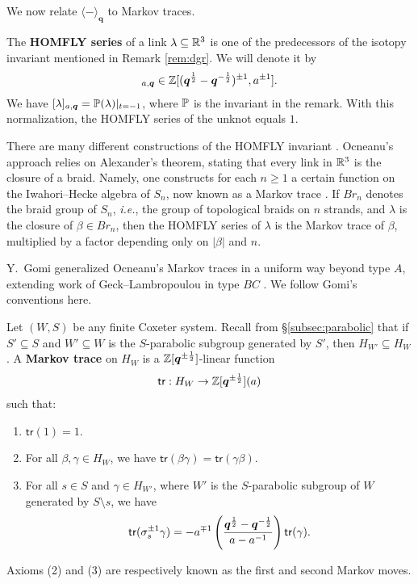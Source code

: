 \documentclass[a4paper,10pt,leqno]{amsart}
\theoremstyle{plain}
\theoremstyle{plain}
\theoremstyle{plain}
\theoremstyle{definition}
\theoremstyle{remark}
\newcommand{\dfemph}[1]{\textbf{#1}}
\newcommand{\Br}{\mathit{Br}}
\newcommand{\Q}{\bm{q}}
\newcommand{\Tr}[1]{\langle{#1}\rangle_{\Q}}
\begin{document}
\subsection{}\label{subsec:markov}

We now relate $\Tr{-}$ to Markov traces.

The \dfemph{HOMFLY series} of a link $\lambda \subseteq \mathbb{R}^3$ is one of the predecessors of the isotopy invariant mentioned in Remark \ref{rem:dgr}.
We will denote it by
\begin{align}
[\lambda]_{a, \Q} \in \bb{Z}[(\Q^{\frac{1}{2}} - \Q^{-\frac{1}{2}})^{\pm 1}, a^{\pm 1}].
\end{align}
We have $[\lambda]_{a, \Q} = \bb{P}(\lambda)|_{t = -1}$, where $\mathbb{P}$ is the invariant in the remark.
With this normalization, the HOMFLY series of the unknot equals $1$.

There are many different constructions of the HOMFLY invariant \cite{homfly}.
Ocneanu's approach relies on Alexander's theorem, stating that every link in $\mathbb{R}^3$ is the closure of a braid.
Namely, one constructs for each $n \geq 1$ a certain function on the Iwahori--Hecke algebra of $S_n$, now known as a Markov trace \cite{jones}.
If $\Br_n$ denotes the braid group of $S_n$, \emph{i.e.}, the group of topological braids on $n$ strands, and $\lambda$ is the closure of $\beta \in \Br_n$, then the HOMFLY series of $\lambda$ is the Markov trace of $\beta$, multiplied by a factor depending only on $|\beta|$ and $n$.

Y.~Gomi generalized Ocneanu's Markov traces in a uniform way beyond type $A$, extending work of Geck--Lambropoulou in type $BC$ \cite{gomi}.
We follow Gomi's conventions here.

Let $(W, S)$ be any finite Coxeter system.
Recall from \S\ref{subsec:parabolic} that if $S' \subseteq S$ and $W' \subseteq W$ is the $S$-parabolic subgroup generated by $S'$, then $H_{W'} \subseteq H_W$.
A \dfemph{Markov trace} on $H_W$ is a $\bb{Z}[\Q^{\pm\frac{1}{2}}]$-linear function
\begin{align}
\mathsf{tr} : H_W \to \bb{Z}[\Q^{\pm\frac{1}{2}}](a)
\end{align}
such that:
\begin{enumerate}
\item 	$\mathsf{tr}(1) = 1$.
\item 	For all $\beta, \gamma \in H_W$, we have $\mathsf{tr}(\beta\gamma) = \mathsf{tr}(\gamma\beta)$.
\item 	For all $s \in S$ and $\gamma \in H_{W'}$, where $W'$ is the $S$-parabolic subgroup of $W$ generated by $S \setminus s$, we have
		\begin{align}
		\mathsf{tr}(\sigma_s^{\pm 1}\gamma) 
		= -a^{\mp 1}
			\pa{\frac{\Q^{\frac{1}{2}} - \Q^{-\frac{1}{2}}}{a - a^{-1}}} 
			\mathsf{tr}(\gamma).
		\end{align}
\end{enumerate}
Axioms (2) and (3) are respectively known as the first and second Markov moves.
\end{document}

